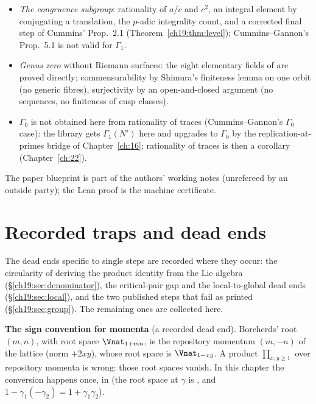 \begin{itemize}
\item \emph{The congruence subgroup}: rationality of $a/c$ and $c^2$, an integral element by conjugating a translation, the $p$-adic integrality
  count, and a corrected final step of Cummins' Prop.~2.1 (Theorem~\ref{ch19:thm:level}); Cummins--Gannon's Prop.~5.1 is not valid for $\Gamma_1$.
\item \emph{Genus zero} without Riemann surfaces: the eight elementary fields of  are proved directly; commensurability
  by Shimura's finiteness lemma on one orbit (no generic fibres), surjectivity by an open-and-closed argument (no sequences, no finiteness of cusp
  classes).
\item \emph{$\Gamma_0$} is not obtained here from rationality of traces (Cummins--Gannon's $\Gamma_0$ case): the library gets $\Gamma_1(N')$ here and
  upgrades to $\Gamma_0$ by the replication-at-primes bridge of Chapter~\ref{ch:16}; rationality of traces is then a corollary (Chapter~\ref{ch:22}).
\end{itemize}
The paper blueprint is part of the authors' working notes (unrefereed by an outside party); the Lean proof is the machine certificate.

\section{Recorded traps and dead ends}\label{ch19:sec:traps}

The dead ends specific to single steps are recorded where they occur: the circularity of deriving the product identity from the Lie
algebra (\S\ref{ch19:sec:denominator}), the critical-pair gap and the local-to-global dead ends (\S\ref{ch19:sec:local}), and the two
published steps that fail as printed (\S\ref{ch19:sec:group}).  The remaining ones are collected here.

\begin{warning}
\textbf{The sign convention for momenta} (a recorded dead end).  Borcherds' root $(m,n)$, with root space
$\Vnat_{1+mn}$, is the repository momentum $(m,-n)$ of the lattice  (norm $+2xy$), whose root space is $\Vnat_{1-xy}$.  A product
$\prod_{x,y\ge1}$ over repository momenta is wrong: those root spaces vanish.  In this chapter the conversion happens once, in
 (the root space at $\gamma$ is , and $1-\gamma_1(-\gamma_2)=1+\gamma_1\gamma_2$).
\end{warning}

